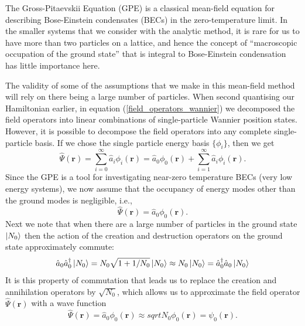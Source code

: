\documentclass[a4paper, 10pt]{article}
\theoremstyle{plain}
\begin{document}
The Gross-Pitaevskii Equation (GPE) is a classical mean-field equation for
describing Bose-Einstein condensates (BECs) in the zero-temperature limit. In
the smaller systems that we consider with the analytic method, it is rare for us
to have more than two particles on a lattice, and hence the concept of
``macroscopic occupation of the ground state'' that is integral to Bose-Einstein
condensation has little importance here.

The validity of some of the assumptions that we make in this mean-field method
will rely on there being a large number of particles. When second quantising our
Hamiltonian earlier, in equation (\ref{field_operators_wannier}) we decomposed
the field operators into linear combinations of single-particle Wannier position
states. However, it is possible to decompose the field operators into any
complete single-particle basis. If we chose the single particle energy basis
$\lbrace \phi_{i} \rbrace$, then we get
\begin{equation}
    \hat{\Psi}(\mathbf{r})
    =
    \sum_{i=0}^{\infty}{\hat{a}_i\phi_{i}(\mathbf{r})}
    =
    \hat{a}_{0} \phi_{0}(\mathbf{r}) +
    \sum_{i=1}^{\infty}{\hat{a}_i\phi_{i}(\mathbf{r})}.
\end{equation}
Since the GPE is a tool for investigating near-zero temperature BECs (very low
energy systems), we now assume that the occupancy of energy modes other than
the ground modes is negligible, i.e.,
\begin{equation}
    \hat{\Psi}(\mathbf{r}) = \hat{a}_{0} \phi_{0}(\mathbf{r}).
\end{equation}
Next we note that when there are a large number of particles in the ground state
$\ket{N_{0}}$ then the action of the creation and destruction operators on the
ground state approximately commute:
\begin{equation}
    \hat{a}_{0} \hat{a}^{\dagger}_{0} \ket{N_{0}}
    =
    N_{0} \sqrt{1+1/N_{0}} \ket{N_{0}}
    \approx
    N_{0} \ket{N_{0}}
    =
    \hat{a}^{\dagger}_{0} \hat{a}_{0} \ket{N_{0}}
\end{equation}
It is this property of commutation that leads us to replace the creation and
annihilation operators by $\sqrt{N_{0}}$, which allows us to approximate the
field operator $\hat{\Psi}(\mathbf{r})$ with a wave function
\begin{equation}
    \hat{\Psi}(\mathbf{r})
    =
    \hat{a}_{0} \phi_{0}(\mathbf{r}) \approx sqrt{N_{0}} \phi_{0}(\mathbf{r})
    =
    \psi_{0}(\mathbf{r}).
\end{equation}
\end{document}
